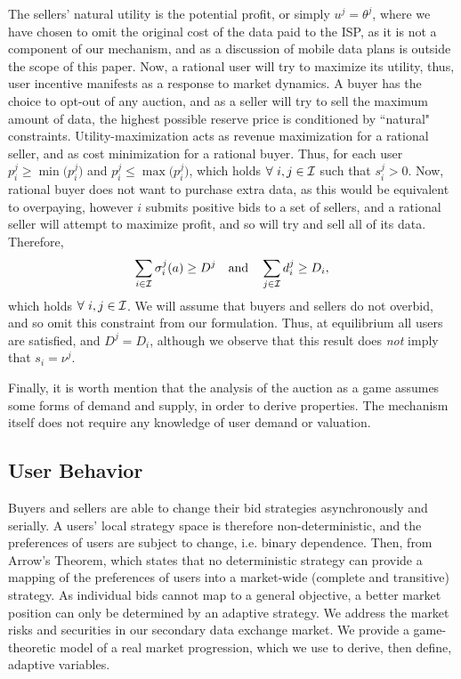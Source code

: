The sellers' natural utility is the potential
profit, or simply $u^j = \theta^j$, where we have chosen to omit the original cost of the data
paid to the ISP, as it is not a component of our mechanism, and as a discussion
of mobile data plans is outside the scope of this paper.  
Now, a rational user will try
to maximize its utility, thus, user incentive manifests as a
response to market dynamics. A buyer has the choice to
opt-out of any auction, and as a seller will try to sell the maximum amount of
data, the highest possible reserve price is conditioned by ``natural" constraints. Utility-maximization 
acts as revenue maximization for a rational seller, and as cost minimization for a
rational buyer. Thus, for each user $p_i^j \ge \min\big(p_i^j)$ and $p_i^j \le
\max\big(p_i^j)$, which holds $\forall \ i, j\in\mathcal{I}$ such that $s_i^j>0$.
Now, rational buyer does not want to purchase extra data, as this would be
equivalent to overpaying, however $i$ submits positive bids to a set of
sellers, and a rational seller will attempt to maximize profit, and so will try and sell all of
its data. Therefore,
\begin{equation}\label{bidcap}
    \displaystyle\sum_{i\in\mathcal{I}} \sigma_i^j(a) \ge D^j \quad\text{and}\quad
\sum_{j\in\mathcal{I}} d^j_i \ge D_i,
\end{equation}
which holds $\forall \ i,j\in\mathcal{I}$. We will assume that buyers and sellers do not overbid, and so omit this constraint from our formulation. Thus, at equilibrium all users are satisfied, and $D^j = D_i$, although we observe that this result does \emph{not} imply that $s_i=\nu^j$. 

Finally, it is worth mention that the analysis of the auction as
a game assumes some forms of demand and supply, in order to derive properties.
The mechanism itself does not require any knowledge of user demand or
valuation. 

\subsection{User Behavior}

Buyers and sellers are able
to change their bid strategies asynchronously and serially.
A users' local strategy space is therefore non-deterministic, and the preferences of users
are subject to change, i.e. binary dependence.
Then, from Arrow's Theorem, which states that no deterministic strategy can
provide a mapping of the preferences of users into a market-wide (complete
and transitive) strategy. As individual bids cannot map to a general objective, a better market
position can only be determined by an adaptive strategy.
We address the market risks and securities in our secondary data exchange market. 
We provide a game-theoretic model of a real market progression, which we use to
derive, then define, adaptive variables. 

